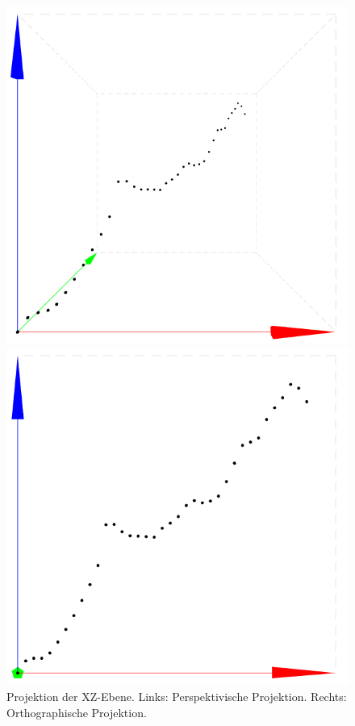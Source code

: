 \begin{figure}[!htbp]
	\centering
	\begin{minipage}{.45\textwidth}
		\includegraphics[width=\linewidth]{images/persp}
	\end{minipage}
	\begin{minipage}{.45\textwidth}
		\includegraphics[width=\linewidth]{images/ortho}
	\end{minipage}
	\caption[Projektion der xz-Ebene]{Projektion der XZ-Ebene. Links: Perspektivische Projektion. Rechts: Orthographische Projektion.}
	\label{fig:projections}
\end{figure}

